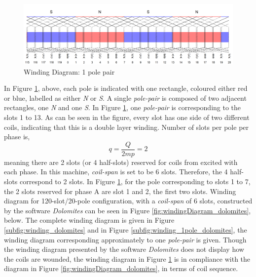 \documentclass[a4paper, 11pt]{article}
\begin{document}
\begin{figure}[b]
	\begin{center}
		\includegraphics[width=1.0\textwidth]{Q1_windingDiagram_1pp.png}
	\end{center}
	\caption{Winding Diagram: 1 pole pair}
	\label{fig:windingDiagram}
\end{figure}

In Figure \ref{fig:windingDiagram}, above, each pole is indicated with one rectangle, coloured either red or blue, labelled as either \textit{N} or \textit{S}. A single \textit{pole-pair} is composed of two adjacent rectangles, one \textit{N} and one \textit{S}. In Figure \ref{fig:windingDiagram}, one \textit{pole-pair} is corresponding to the slots 1 to 13. As can be seen in the figure, every slot has one side of two different coils, indicating that this is a double layer winding. Number of slots per pole per phase is,
\begin{equation}
q=\frac{Q}{2mp}=2
\end{equation}
meaning there are 2 slots (or 4 half-slots) reserved for coils from excited with each phase. In this machine, \textit{coil-span} is set to be 6 slots. Therefore, the 4 half-slots correspond to 2 slots. In Figure \ref{fig:windingDiagram}, for the pole corresponding to slots 1 to 7, the 2 slots reserved for phase A are slot 1 and 2, the first two slots.
Winding diagram for 120-slot/20-pole configuration, with a \textit{coil-span} of 6 slots, constructed by the software \textit{Dolomites} can be seen in Figure \ref{fig:windingDiagram_dolomites}, below. The complete winding diagram is given in Figure \ref{subfig:winding_dolomites} and in Figure \ref{subfig:winding_1pole_dolomites}, the winding diagram corresponding approximately to one \textit{pole-pair} is given. Though the winding diagram presented by the software \textit{Dolomites} does not display how the coils are wounded, the winding diagram in Figure \ref{fig:windingDiagram} is in compliance with the diagram in Figure \ref{fig:windingDiagram_dolomites}, in terms of coil sequence.
\end{document}
